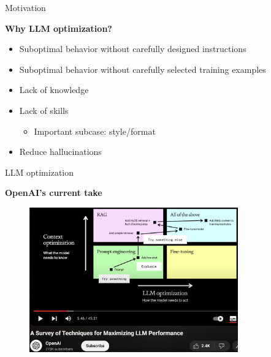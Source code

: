\begin{vbframe}{Motivation}

\vfill

\textbf{Why LLM optimization?}

	\begin{itemize}
                \item Suboptimal behavior without carefully
		designed instructions
                \item Suboptimal behavior without carefully
		selected training examples
		\item Lack of knowledge
                \item Lack of skills
	\begin{itemize}
        \item Important subcase: style/format
	\end{itemize}
                \item Reduce hallucinations
	\end{itemize}

\vfill

\end{vbframe}



\begin{vbframe}{LLM optimization}

\vfill

\textbf{OpenAI's current take}

\textbf{\href{https://www.youtube.com/watch?v=ahnGLM-RC1Y}{}}


\vfill

\begin{figure}
\centering
\includegraphics[width = 9cm]{figure/openai,llm,optimization.png}
\end{figure}




\vfill

\end{vbframe}

